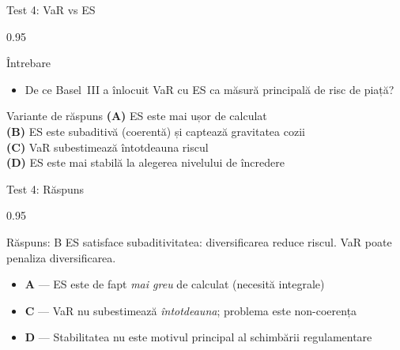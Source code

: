 \documentclass[9pt, aspectratio=169, t]{beamer}
\begin{document}
\begin{frame}{Test 4: VaR vs ES}
\begin{cminipage}{0.95\textwidth}
    \begin{alertblock}{Întrebare}
        \begin{itemize}\setlength{\itemsep}{0pt}
            \item De ce Basel~III a înlocuit VaR cu ES ca măsură principală de risc de piață?
        \end{itemize}
    \end{alertblock}

    \vspace{0.3cm}

    \begin{block}{Variante de răspuns}
        \textcolor{MainBlue}{\textbf{(A)}} ES este mai ușor de calculat\\[3pt]
        \textcolor{MainBlue}{\textbf{(B)}} ES este subaditivă (coerentă) și captează gravitatea cozii\\[3pt]
        \textcolor{MainBlue}{\textbf{(C)}} VaR subestimează întotdeauna riscul\\[3pt]
        \textcolor{MainBlue}{\textbf{(D)}} ES este mai stabilă la alegerea nivelului de încredere
    \end{block}
\end{cminipage}
\end{frame}

\begin{frame}{Test 4: Răspuns}
\begin{cminipage}{0.95\textwidth}
    \begin{exampleblock}{Răspuns: B}
        ES satisface subaditivitatea: diversificarea reduce riscul. VaR poate penaliza diversificarea.
    \end{exampleblock}

    \vspace{0.2cm}

    \begin{itemize}\setlength{\itemsep}{0pt}
        \item \textbf{A} --- ES este de fapt \textit{mai greu} de calculat (necesită integrale) \incorrect
        \item \textbf{C} --- VaR nu subestimează \textit{întotdeauna}; problema este non-coerența \incorrect
        \item \textbf{D} --- Stabilitatea nu este motivul principal al schimbării regulamentare \incorrect
    \end{itemize}
\end{cminipage}
\end{frame}
\end{document}
